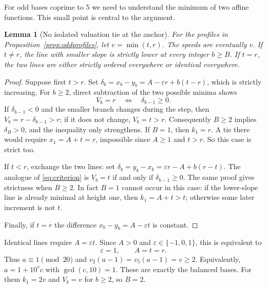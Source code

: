 \documentclass[11pt,letterpaper]{article}
\numberwithin{equation}{section}
\newtheorem{lemma}[theorem]{Lemma}
\theoremstyle{definition}
\begin{document}
For odd bases coprime to 5 we need to understand the minimum of two affine
functions. This small point is central to the argument.

\begin{lemma}[No isolated valuation tie at the anchor]\label{lem:anchor}
For the profiles in Proposition~\ref{prop:oddprofiles}, let $v=\min(t,r)$.
The speeds are eventually $v$. If $t\ne r$, the line with smaller slope is
\emph{strictly} lower at every integer $b\geq B$. If $t=r$, the two lines are
either strictly ordered everywhere or identical everywhere.
\end{lemma}
\begin{proof}
Suppose first $t>r$. Set
$\delta_b=x_b-y_b=A-\varepsilon r+b(t-r)$, which is strictly increasing.
For $b\geq2$, direct subtraction of the two possible minima shows
\begin{equation}\label{eq:criterion}
 V_b=r\quad\Longleftrightarrow\quad\delta_{b-1}\geq0.
\end{equation}
If $\delta_{b-1}<0$ and the smaller branch changes during the step, then
$V_b=r-\delta_{b-1}>r$; if it does not change, $V_b=t>r$.
Consequently $B\geq2$ implies $\delta_B>0$, and the inequality only strengthens.
If $B=1$, then $k_1=r$. A tie there would require
$x_1=A+t=r$, impossible since $A\geq1$ and $t>r$. So this case is strict too.

If $t<r$, exchange the two lines: set
$\delta_b=y_b-x_b=\varepsilon r-A+b(r-t)$. The analogue of
\eqref{eq:criterion} is $V_b=t$ if and only if $\delta_{b-1}\geq0$.
The same proof gives strictness when $B\geq2$. In fact $B=1$ cannot occur in
this case: if the lower-slope line is already minimal at height one, then
$k_1=A+t>t$; otherwise some later increment is not $t$.

Finally, if $t=r$ the difference $x_b-y_b=A-\varepsilon t$ is constant.
\end{proof}

Identical lines require $A=\varepsilon t$. Since $A>0$ and
$\varepsilon\in\{-1,0,1\}$, this is equivalent to
\begin{equation}\label{eq:balancecondition}
 \varepsilon=1,\qquad A=t=r.
\end{equation}
Thus $a\equiv1\pmod{20}$ and
$v_2(a-1)=v_5(a-1)=v\geq2$. Equivalently,
$a=1+10^v c$ with $\gcd(c,10)=1$. These are exactly the balanced bases.
For them $k_1=2v$ and $V_b=v$ for $b\geq2$, so $B=2$.
\end{document}
